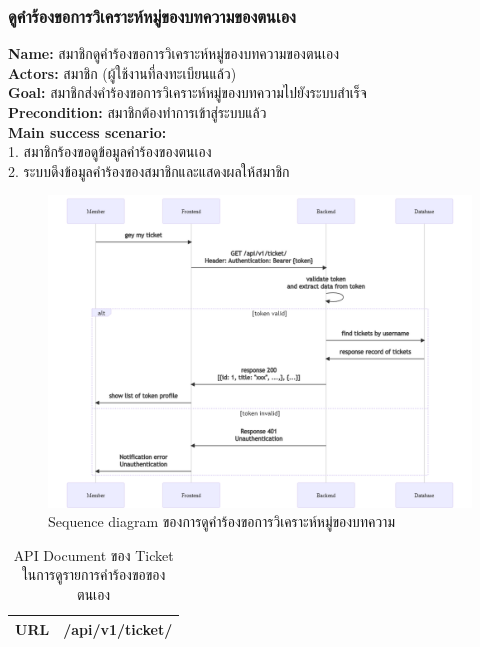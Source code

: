 \documentclass[12pt,oneside,openright,a4paper]{cpe-thai-project}
\begin{document}
\begin{itemize}
\subsubsection{ดูคำร้องขอการวิเคราะห์หมู่ของบทความของตนเอง}
\textbf{Name: }สมาชิกดูคำร้องขอการวิเคราะห์หมู่ของบทความของตนเอง \\
\textbf{Actors: }สมาชิก (ผู้ใช้งานที่ลงทะเบียนแล้ว) \\
\textbf{Goal: }สมาชิกส่งคำร้องขอการวิเคราะห์หมู่ของบทความไปยังระบบสำเร็จ \\
\textbf{Precondition: }สมาชิกต้องทำการเข้าสู่ระบบแล้ว \\
\textbf{Main success scenario: } \\
  \hspace*{0.5cm}1. สมาชิกร้องขอดูข้อมูลคำร้องของตนเอง  \\
  \hspace*{0.5cm}2. ระบบดึงข้อมูลคำร้องของสมาชิกและแสดงผลให้สมาชิก \\ \newpage
\begin{figure}[!ht]\centering
  \includegraphics[width=\textwidth]{./img/seq_request.png}
  \caption{Sequence diagram ของการดูคำร้องขอการวิเคราะห์หมู่ของบทความ}\label{fig:seq_request} 
\end{figure} 
\begin{longtable}[!ht]{p{3cm}|p{8cm}}
  \caption{API Document ของ Ticket ในการดูรายการคำร้องขอของตนเอง}\label{tbl:api_ticket} 
    \endfirsthead
    \endhead
    \hhline{==}  
    \textbf{URL}              & /api/v1/ticket/                                                                                             \\ \hline

\end{longtable}
\end{itemize}
\end{document}
